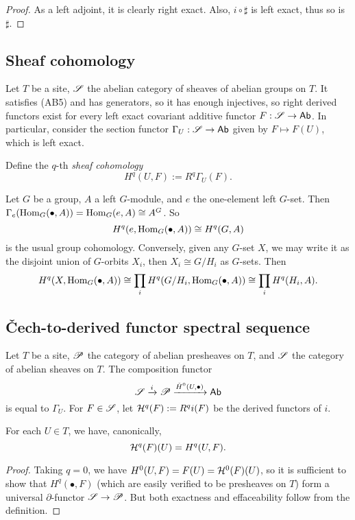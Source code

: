 \documentclass[11pt]{amsart}
\begin{document}
\begin{proof}
    As a left adjoint, it is clearly right exact. Also, $i\circ \sharp$ is left exact, thus so is $\sharp$.
\end{proof}


\subsection{Sheaf cohomology}

Let $T$ be a site, $\mathscr{S}$ the abelian category of sheaves of abelian groups on $T$. It satisfies (AB5) and has generators, so it has enough injectives, so right derived functors exist for every left exact covariant additive functor $F:\mathscr{S}\to \mathsf{Ab}$. In particular, consider the section functor $\Gamma_U: \mathscr{S}\to \mathsf{Ab}$ given by $F\mapsto F(U)$, which is left exact.

\begin{defn}
    Define the $q$-th \emph{sheaf cohomology} 
    \[H^q(U, F):= R^q\Gamma_U(F).\]
\end{defn}

\begin{exm}
    Let $G$ be a group, $A$ a left $G$-module, and $e$ the one-element left $G$-set. Then $\Gamma_e(\operatorname{Hom}_G(\bullet, A)) = \operatorname{Hom}_G(e, A) \cong A^G$. So
    \[H^q(e, \operatorname{Hom}_G(\bullet, A)) \cong H^q(G, A)\]
    is the usual group cohomology. Conversely, given any $G$-set $X$, we may write it as the disjoint union of $G$-orbits $X_i$, then $X_i\cong G/H_i$ as $G$-sets. Then
    \[H^q(X, \operatorname{Hom}_G(\bullet, A)) \cong \prod_i H^q(G/H_i, \operatorname{Hom}_G(\bullet, A)) \cong \prod_i H^q(H_i, A).\]
\end{exm}


\subsection{\v{C}ech-to-derived functor spectral sequence}

Let $T$ be a site, $\mathscr{P}$ the category of abelian presheaves on $T$, and $\mathscr{S}$ the category of abelian sheaves on $T$. The composition functor 
\[\mathscr{S} \xrightarrow{i} \mathscr{P} \xrightarrow{\check{H}^0(U, \bullet)} \mathsf{Ab}\] 
is equal to $\Gamma_U$. For $F\in \mathscr{S}$, let $\mathcal{H}^q(F) := R^qi(F)$ be the derived functors of $i$.


\begin{prop}
    For each $U\in T$, we have, canonically, 
    \[\mathcal{H}^q(F)(U) = H^q(U, F).\]
\end{prop}

\begin{proof}
    Taking $q = 0$, we have $H^0(U, F) = F(U) = \mathcal{H}^0(F)(U)$, so it is sufficient to show that $H^q(\bullet, F)$ (which are easily verified to be presheaves on $T$) form a universal $\partial$-functor $\mathscr{S}\to \mathscr{P}$. But both exactness and effaceability follow from the definition.
\end{proof}
\end{document}
